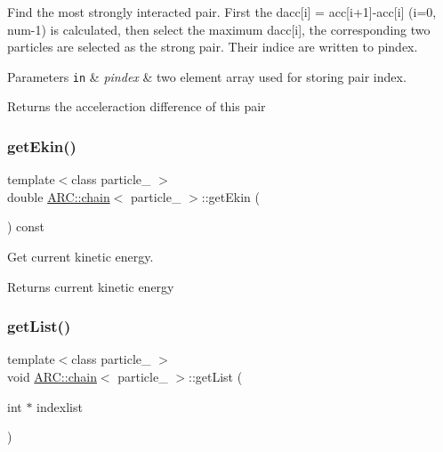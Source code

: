Find the most strongly interacted pair. First the dacc\mbox{[}i\mbox{]} = acc\mbox{[}i+1\mbox{]}-\/acc\mbox{[}i\mbox{]} (i=0, num-\/1) is calculated, then select the maximum dacc\mbox{[}i\mbox{]}, the corresponding two particles are selected as the strong pair. Their indice are written to pindex. 
\begin{DoxyParams}[1]{Parameters}
\mbox{\tt in}  & {\em pindex} & two element array used for storing pair index. \\
\hline
\end{DoxyParams}
\begin{DoxyReturn}{Returns}
the acceleraction difference of this pair 
\end{DoxyReturn}
\hypertarget{classARC_1_1chain_acfb02b995ba72aef1e9e283d7d04adb8}{}\label{classARC_1_1chain_acfb02b995ba72aef1e9e283d7d04adb8} 
\subsubsection{\texorpdfstring{get\+Ekin()}{getEkin()}}
{\footnotesize\ttfamily template$<$class particle\+\_\+ $>$ \\
double \hyperlink{classARC_1_1chain}{A\+R\+C\+::chain}$<$ particle\+\_\+ $>$\+::get\+Ekin (\begin{DoxyParamCaption}{ }\end{DoxyParamCaption}) const\hspace{0.3cm}{\ttfamily [inline]}}



Get current kinetic energy. 

\begin{DoxyReturn}{Returns}
current kinetic energy 
\end{DoxyReturn}
\hypertarget{classARC_1_1chain_ac1e6e8a2b02cb987c6da8ea2a8d06129}{}\label{classARC_1_1chain_ac1e6e8a2b02cb987c6da8ea2a8d06129} 
\subsubsection{\texorpdfstring{get\+List()}{getList()}}
{\footnotesize\ttfamily template$<$class particle\+\_\+ $>$ \\
void \hyperlink{classARC_1_1chain}{A\+R\+C\+::chain}$<$ particle\+\_\+ $>$\+::get\+List (\begin{DoxyParamCaption}\item[{int $\ast$}]{indexlist }\end{DoxyParamCaption})\hspace{0.3cm}{\ttfamily [inline]}}



